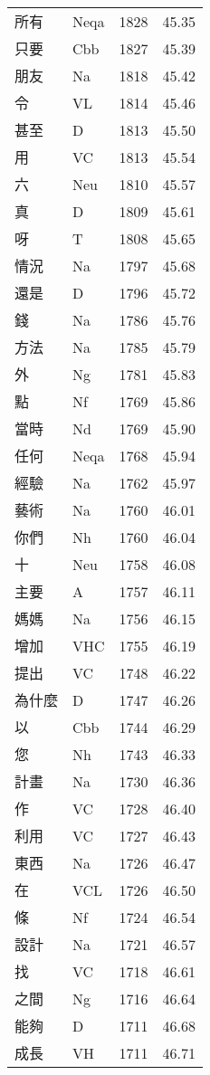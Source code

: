 \documentclass[twocolumn]{book}
\begin{document}
\begin{supertabular}{llrr}
所有 & Neqa & 1828 &  45.35\\
只要 & Cbb & 1827 &  45.39\\
朋友 & Na & 1818 &  45.42\\
令 & VL & 1814 &  45.46\\
甚至 & D & 1813 &  45.50\\
用 & VC & 1813 &  45.54\\
六 & Neu & 1810 &  45.57\\
真 & D & 1809 &  45.61\\
呀 & T & 1808 &  45.65\\
情況 & Na & 1797 &  45.68\\
還是 & D & 1796 &  45.72\\
錢 & Na & 1786 &  45.76\\
方法 & Na & 1785 &  45.79\\
外 & Ng & 1781 &  45.83\\
點 & Nf & 1769 &  45.86\\
當時 & Nd & 1769 &  45.90\\
任何 & Neqa & 1768 &  45.94\\
經驗 & Na & 1762 &  45.97\\
藝術 & Na & 1760 &  46.01\\
你們 & Nh & 1760 &  46.04\\
十 & Neu & 1758 &  46.08\\
主要 & A & 1757 &  46.11\\
媽媽 & Na & 1756 &  46.15\\
增加 & VHC & 1755 &  46.19\\
提出 & VC & 1748 &  46.22\\
為什麼 & D & 1747 &  46.26\\
以 & Cbb & 1744 &  46.29\\
您 & Nh & 1743 &  46.33\\
計畫 & Na & 1730 &  46.36\\
作 & VC & 1728 &  46.40\\
利用 & VC & 1727 &  46.43\\
東西 & Na & 1726 &  46.47\\
在 & VCL & 1726 &  46.50\\
條 & Nf & 1724 &  46.54\\
設計 & Na & 1721 &  46.57\\
找 & VC & 1718 &  46.61\\
之間 & Ng & 1716 &  46.64\\
能夠 & D & 1711 &  46.68\\
成長 & VH & 1711 &  46.71\\

\end{supertabular}
\end{document}
